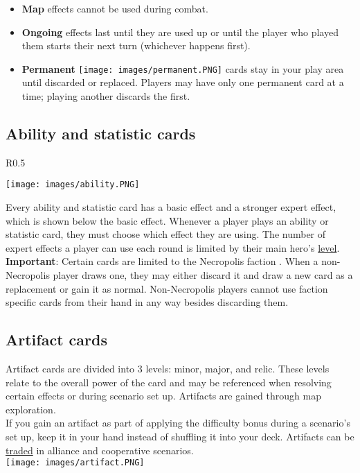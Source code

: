 \documentclass[12pt]{article}
\begin{document}
\begin{enumerate}
\begin{itemize}
        \item \textbf{Map}  effects cannot be used during combat.  
        \item \textbf{Ongoing}  effects last until they are used up or until the player who played them starts their next turn (whichever happens first).
        \item \textbf{Permanent} \texttt{[image: images/permanent.PNG]} cards stay in your play area until discarded or replaced. Players may have only one permanent card at a time; playing another discards the first.
    \end{itemize}

\end{enumerate}

\clearpage
\subsection*{\hypertarget{Ability}{Ability and statistic cards}}
\begin{wrapfigure}{R}{0.5\textwidth}
 
    \texttt{[image: images/ability.PNG]}

\end{wrapfigure}
Every ability and statistic card has a basic effect and a stronger expert effect, which is shown below the basic effect. Whenever a player plays an ability or statistic card, they must choose which effect they are using. The number of expert  effects a player can use each round is limited by their main hero’s \hyperlink{Level}{level}.\\[6pt]
\textbf{Important}: Certain cards are limited to the Necropolis faction . When a non-Necropolis player draws one, they may either discard it and draw a new card as a replacement or gain it as normal. Non-Necropolis players cannot use faction specific cards from their hand in any way besides discarding them.
\subsection*{Artifact cards}
Artifact cards are divided into 3 levels: minor, major, and relic. These levels relate to the overall power of the card and may be referenced when resolving certain effects or during scenario set up. Artifacts are gained through map exploration.\\[6pt]
If you gain an artifact as part of applying the difficulty bonus during a scenario’s set up, keep it in your hand instead of shuffling it into your deck.
Artifacts can be \hyperlink{Trading}{traded} in alliance and cooperative scenarios.\\[6pt]
\texttt{[image: images/artifact.PNG]}
\end{document}
